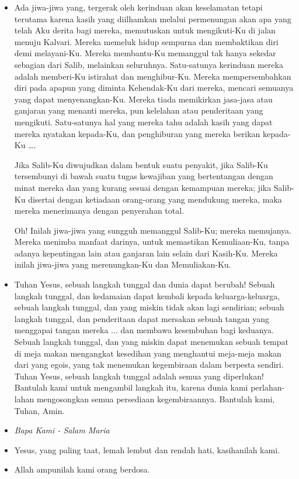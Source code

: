 \documentclass[a5paper,headsepline,titlepage,10pt,nnormalheadings,DIVcalc]{scrbook}
\newcommand{\BU}[1]{\begin{itemize} \item[U:] #1 \end{itemize}}
\newcommand{\BP}[1]{\begin{itemize} \item[P:] #1 \end{itemize}}
\newcommand{\kasihanilahKami}{\BP{Yesus, yang paling taat, lemah lembut dan rendah hati, kasihanilah kami.}
\BU{Allah ampunilah kami orang berdosa.}}
\begin{document}
\BP{Ada jiwa-jiwa yang, tergerak oleh kerinduan akan keselamatan tetapi terutama karena kasih yang diilhamkan melalui permenungan akan apa yang telah Aku derita bagi mereka, memutuskan untuk mengikuti-Ku di jalan menuju Kalvari. Mereka memeluk hidup sempurna dan membaktikan diri demi melayani-Ku. Mereka membantu-Ku memanggul tak hanya sekedar sebagian dari Salib, melainkan seluruhnya. Satu-satunya kerinduan mereka adalah memberi-Ku istirahat dan menghibur-Ku. Mereka mempersembahkan diri pada apapun yang diminta Kehendak-Ku dari mereka, mencari semuanya yang dapat menyenangkan-Ku. Mereka tiada memikirkan jasa-jasa atau ganjaran yang menanti mereka, pun kelelahan atau penderitaan yang mengikuti. Satu-satunya hal yang mereka tahu adalah kasih yang dapat mereka nyatakan kepada-Ku, dan penghiburan yang mereka berikan kepada-Ku \dots .

Jika Salib-Ku diwujudkan dalam bentuk suatu penyakit, jika Salib-Ku tersembunyi di bawah suatu tugas kewajiban yang bertentangan dengan minat mereka dan yang kurang sesuai dengan kemampuan mereka; jika Salib-Ku disertai dengan ketiadaan orang-orang yang mendukung mereka, maka mereka menerimanya dengan penyerahan total.

Oh! Inilah jiwa-jiwa yang sungguh memanggul Salib-Ku; mereka memujanya. Mereka menimba manfaat darinya, untuk memastikan Kemuliaan-Ku, tanpa adanya kepentingan lain atau ganjaran lain selain dari Kasih-Ku. Mereka inilah jiwa-jiwa yang merenungkan-Ku dan Memuliakan-Ku.}

\BU{Tuhan Yesus, sebuah langkah tunggal dan dunia dapat berubah! Sebuah langkah tunggal, dan kedamaian dapat kembali kepada keluarga-keluarga, sebuah langkah tunggal, dan yang miskin tidak akan lagi sendirian; sebuah langkah tunggal, dan penderitaan dapat mersakan sebuah tangan yang menggapai tangan mereka ... dan membawa kesembuhan bagi keduanya. Sebuah langkah tunggal, dan yang miskin dapat menemukan sebuah tempat di meja makan mengangkat kesedihan yang menghantui meja-meja makan dari yang egois, yang tak menemukan kegembiraan dalam berpesta sendiri. Tuhan Yesus, sebuah langkah tunggal adalah semua yang diperlukan! Bantulah kami untuk mengambil langkah itu, karena dunia kami perlahan-lahan mengosongkan semua persediaan kegembiraannya. Bantulah kami, Tuhan, Amin.}

\large\begin{itemize}\item[~]\it{Bapa Kami - Salam Maria}\end{itemize}\normalsize
\kasihanilahKami
 
\end{document}
